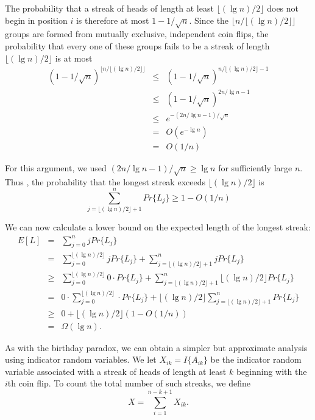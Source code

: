 \documentclass[12pt]{article}
\begin{document}
The probability that a streak of heads of length at least $\lfloor (\lg n)/2 \rfloor$ does not begin in position $i$ is therefore at most $1 - 1 / \sqrt n$. Since the $\lfloor n / \lfloor (\lg n)/2 \rfloor \rfloor$ groups are formed from mutually exclusive, independent coin flips, the probability that every one of these groups fails to be a streak of length $\lfloor (\lg n)/2 \rfloor$ is at most
\begin{eqnarray*}
  (1 - 1 / \sqrt n)^{\lfloor n/ {\lfloor (\lg n)/2 \rfloor} \rfloor}
  &\le& (1 - 1 / \sqrt n)^{n/ {\lfloor (\lg n)/2 \rfloor} - 1} \\
  &\le& (1 - 1 / \sqrt n)^{2n/ {\lg n} - 1} \\
  &\le& e^{-(2n/ {\lg n} -1)/{\sqrt n}} \\
  &=& O(e^{- \lg n}) \\
  &=& O(1/n)
\end{eqnarray*}

For this argument, we used $(2n / {\lg n} - 1) / {\sqrt n} \ge \lg n$ for sufficiently large $n$. \\

Thus , the probability that the longest streak exceeds $\lfloor (\lg n)/2 \rfloor$ is
\begin{equation*}
  \sum_{j = \lfloor (\lg n)/2 \rfloor + 1}^{n} Pr \{ L_j \} \ge 1 - O(1/n)
\end{equation*}

We can now calculate a lower bound on the expected length of the longest streak:
\begin{eqnarray*}
  E[L]
  &=& \sum_{j=0}^{n} j Pr \{ L_j \} \\
  &=& \sum_{j=0}^{\lfloor (\lg n)/2 \rfloor} j Pr \{ L_j \}
      + \sum_{j = \lfloor (\lg n)/2 \rfloor + 1}^{n} j Pr \{ L_j \} \\
  &\ge& \sum_{j=0}^{\lfloor (\lg n)/2 \rfloor} 0 \cdot Pr \{ L_j \}
      + \sum_{j = \lfloor (\lg n)/2 \rfloor + 1}^{n} 
      \lfloor (\lg n)/2 \rfloor Pr \{ L_j \} \\
  &=& 0 \cdot \sum_{j=0}^{\lfloor (\lg n)/2 \rfloor} \cdot Pr \{ L_j \}
      + \lfloor (\lg n)/2 \rfloor \sum_{j = \lfloor (\lg n)/2 \rfloor + 1}^{n}
      Pr \{ L_j \} \\
  &\ge& 0 + \lfloor (\lg n)/2 \rfloor (1 - O(1/n)) \\
  &=& \Omega (\lg n).
\end{eqnarray*}

As with the birthday paradox, we can obtain a simpler but approximate analysis using indicator random variables. We let $X_{ik} = I \{ A_{ik} \}$ be the indicator random variable associated with a streak of heads of length at least $k$ beginning with the $i$th coin flip. To count the total number of such streaks, we define
\begin{equation*}
  X = \sum_{i=1}^{n-k+1} X_{ik}.
\end{equation*}
\end{document}
